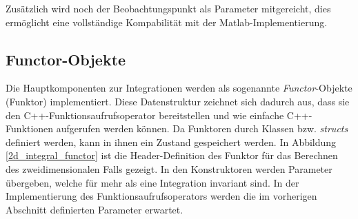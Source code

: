 Zusätzlich wird noch der Beobachtungspunkt als Parameter mitgereicht, dies ermöglicht eine vollständige Kompabilität mit der Matlab-Implementierung.

\subsection{Functor-Objekte}\label{sec_functor}

Die Hauptkomponenten zur Integrationen werden als sogenannte \textit{Functor}-Objekte (Funktor) implementiert.
Diese Datenstruktur zeichnet sich dadurch aus, dass sie den C++-Funktionsaufrufsoperator bereitstellen und wie einfache C++-Funktionen aufgerufen werden können.
Da Funktoren durch Klassen bzw. \textit{structs} definiert werden, kann in ihnen ein Zustand gespeichert werden.
In Abbildung \ref{2d_integral_functor} ist die Header-Definition des Funktor für das Berechnen des zweidimensionalen Falls gezeigt.
In den Konstruktoren werden Parameter übergeben, welche für mehr als eine Integration invariant sind. In der Implementierung des Funktionsaufrufsoperators werden die im vorherigen Abschnitt definierten Parameter erwartet.

\begin{center}
    
    \label{2d_integral_functor}
\end{center}